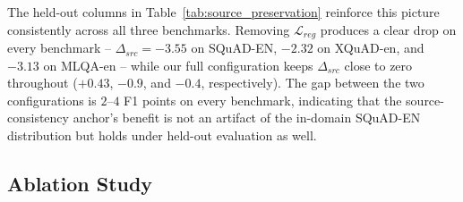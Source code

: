 \documentclass[11pt]{article}
\begin{document}
The held-out columns in Table~\ref{tab:source_preservation} reinforce this picture consistently across all three benchmarks. Removing $\mathcal{L}_{reg}$ produces a clear drop on every benchmark -- $\Delta_{src}=-3.55$ on SQuAD-EN, $-2.32$ on XQuAD-en, and $-3.13$ on MLQA-en -- while our full configuration keeps $\Delta_{src}$ close to zero throughout ($+0.43$, $-0.9$, and $-0.4$, respectively). The gap between the two configurations is $2$--$4$ F1 points on every benchmark, indicating that the source-consistency anchor's benefit is not an artifact of the in-domain SQuAD-EN distribution but holds under held-out evaluation as well.

\subsection{Ablation Study}

\begin{table}[t]
\centering
\small
{}
\caption{Ablation study isolating the variables of the coordinated alignment framework. All configurations from M1 to M5 utilize domain consistency ($\mathcal{L}_{reg}$) to anchor the source representation. The progression demonstrates the cumulative synergy of spatial and temporal regularizations.}
\label{tab:ablation_study}
\end{table}
\end{document}
